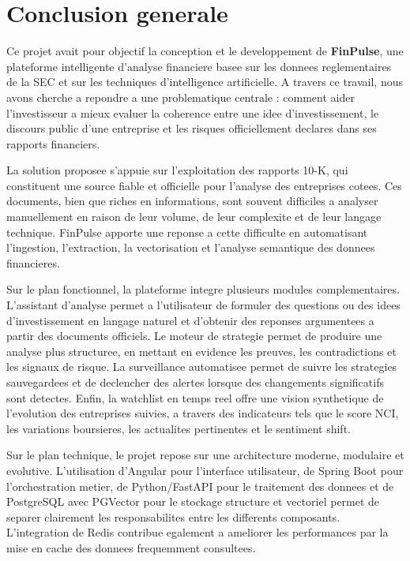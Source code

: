 \chapter*{Conclusion generale}

Ce projet avait pour objectif la conception et le developpement de \textbf{FinPulse},
une plateforme intelligente d'analyse financiere basee sur les donnees reglementaires
de la SEC et sur les techniques d'intelligence artificielle. A travers ce travail,
nous avons cherche a repondre a une problematique centrale : comment aider
l'investisseur a mieux evaluer la coherence entre une idee d'investissement, le
discours public d'une entreprise et les risques officiellement declares dans ses
rapports financiers.

La solution proposee s'appuie sur l'exploitation des rapports 10-K, qui constituent
une source fiable et officielle pour l'analyse des entreprises cotees. Ces documents,
bien que riches en informations, sont souvent difficiles a analyser manuellement en
raison de leur volume, de leur complexite et de leur langage technique. FinPulse
apporte une reponse a cette difficulte en automatisant l'ingestion, l'extraction, la
vectorisation et l'analyse semantique des donnees financieres.

Sur le plan fonctionnel, la plateforme integre plusieurs modules complementaires.
L'assistant d'analyse permet a l'utilisateur de formuler des questions ou des idees
d'investissement en langage naturel et d'obtenir des reponses argumentees a partir des
documents officiels. Le moteur de strategie permet de produire une analyse plus
structuree, en mettant en evidence les preuves, les contradictions et les signaux de
risque. La surveillance automatisee permet de suivre les strategies sauvegardees et de
declencher des alertes lorsque des changements significatifs sont detectes. Enfin, la
watchlist en temps reel offre une vision synthetique de l'evolution des entreprises
suivies, a travers des indicateurs tels que le score NCI, les variations boursieres,
les actualites pertinentes et le sentiment shift.

Sur le plan technique, le projet repose sur une architecture moderne, modulaire et
evolutive. L'utilisation d'Angular pour l'interface utilisateur, de Spring Boot pour
l'orchestration metier, de Python/FastAPI pour le traitement des donnees et de
PostgreSQL avec PGVector pour le stockage structure et vectoriel permet de separer
clairement les responsabilites entre les differents composants. L'integration de Redis
contribue egalement a ameliorer les performances par la mise en cache des donnees
frequemment consultees.

